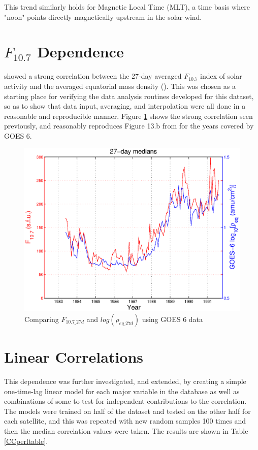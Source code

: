 This trend similarly holds for Magnetic Local Time (MLT), a time basis where "noon" points directly magnetically upstream in the solar wind.   

\section{$F_{10.7}$ Dependence}
\cite{Takahashi2010SolarCycleVariation} showed a strong correlation between the 27-day averaged $F_{10.7}$ index of solar activity and the averaged equatorial mass density (\req). This was chosen as a starting place for verifying the data analysis routines developed for this dataset, so as to show that data input, averaging, and interpolation were all done in a reasonable and reproducible manner. Figure \ref{fig:F107rhoeq27dcomparison} shows the strong correlation seen previously, and reasonably reproduces Figure 13.b from \cite{Takahashi2010SolarCycleVariation} for the years covered by GOES 6.

\begin{figure}
\centering
\includegraphics[width=0.7\linewidth]{Figures/F107MD27d-GOES6}
\caption{Comparing $F_{10.7\_27d}$ and $log(\rho_{eq\_27d})$ using GOES 6 data}
\label{fig:F107rhoeq27dcomparison}
\end{figure}

\section{Linear Correlations}
This dependence was further investigated, and extended, by creating a simple one-time-lag linear model for each major variable in the database as well as combinations of some to test for independent contributions to the correlation. The models were trained on half of the dataset and tested on the other half for each satellite, and this was repeated with new random samples 100 times and then the median correlation values were taken. The results are shown in Table \ref{CCperltable}.

